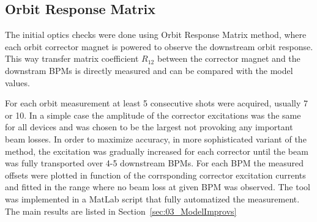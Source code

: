 \subsection{Orbit Response Matrix}

The initial optics checks were done using Orbit Response Matrix method, where each
orbit corrector magnet is powered to observe the downstream orbit response. 
This way transfer matrix coefficient $R_{12}$ between the corrector magnet and 
the downstram BPMs is directly measured and can be compared
with the model values.

For each orbit measurement at least 5 consecutive shots were acquired, usually 7 or 10.
In a simple case the amplitude of the corrector excitations was the same for all devices
and was chosen to be the largest not provoking any important beam losses.
In order to maximize accuracy, in more sophisticated variant of the method, the excitation was
gradually increased for each corrector until the beam was fully transported over
4-5 downstream BPMs. For each BPM the measured offsets were plotted in function of 
the corrsponding corrector excitation currents and 
fitted in the range where no beam loss at given BPM was observed.
The tool was implemented in a MatLab script that 
fully automatized the measurement. 
The main results are listed in Section~\ref{sec:03_ModelImprovs}


